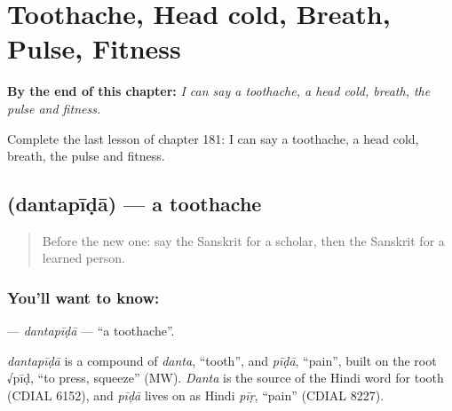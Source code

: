 
\chapter{Toothache, Head cold, Breath, Pulse, Fitness}
\label{ch:sa-toothache-head-cold-breath-pulse-fitness}

\begin{chapteropening}
\textbf{By the end of this chapter:} \emph{I can say a toothache, a head cold, breath, the pulse and fitness.}

Complete the last lesson of chapter 181: I can say a toothache, a head cold, breath, the pulse and fitness.
\end{chapteropening}

\section[\texorpdfstring{\sk{दन्तपीडा} (dantapīḍā)}{दन्तपीडा (dantapīḍā)}]{ (dantapīḍā) — a toothache}

\label{lesson:SA-C181-dantapida}



\begin{quote}
Before the new one: say the Sanskrit for a scholar, then the Sanskrit for a learned person.
\end{quote}

\subsection*{You'll want to know: }
\textbf{} — \emph{dantapīḍā} — \textquotedblleft{}a toothache\textquotedblright{}.

\begin{cousinweb}
\emph{dantapīḍā} is a compound of \emph{danta}, \textquotedblleft{}tooth\textquotedblright{}, and \emph{pīḍā}, \textquotedblleft{}pain\textquotedblright{}, built on the root √pīḍ, \textquotedblleft{}to press, squeeze\textquotedblright{} (MW). \emph{Danta} is the source of the Hindi word for tooth (CDIAL 6152), and \emph{pīḍā} lives on as Hindi \emph{pīṛ}, \textquotedblleft{}pain\textquotedblright{} (CDIAL 8227).
\end{cousinweb}

